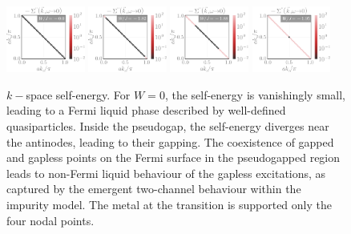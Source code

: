 \documentclass[reprint,hidelinks,onecolumn]{revtex4-2}
\begin{document}
\begin{figure}[htpb]
	\centering
	\includegraphics[width=0.23\textwidth]{selfEnergyKspace-1.pdf}
	\includegraphics[width=0.23\textwidth]{selfEnergyKspace-2.pdf}
	\includegraphics[width=0.23\textwidth]{selfEnergyKspace-3.pdf}
	\includegraphics[width=0.23\textwidth]{selfEnergyKspace-4.pdf}
	\caption{\(k-\)space self-energy. For \(W=0\), the self-energy is vanishingly small, leading to a Fermi liquid phase described by well-defined quasiparticles. Inside the pseudogap, the self-energy diverges near the antinodes, leading to their gapping. The coexistence of gapped and gapless points on the Fermi surface in the pseudogapped region leads to non-Fermi liquid behaviour of the gapless excitations, as captured by the emergent two-channel behaviour within the impurity model. The metal at the transition is supported only the four nodal points.}
	\label{selfenergy}
\end{figure}
\end{document}
